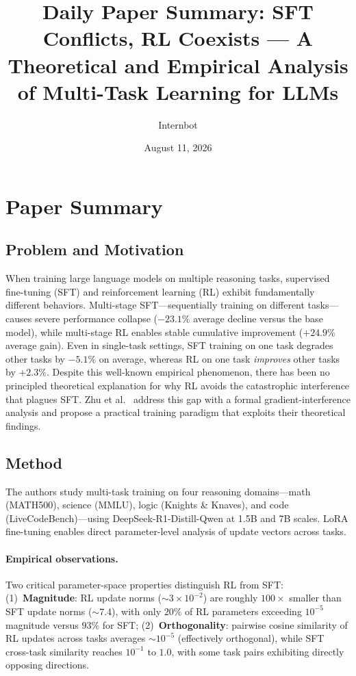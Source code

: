 \documentclass[11pt,a4paper]{article}
\title{Daily Paper Summary: SFT Conflicts, RL Coexists --- A Theoretical and Empirical Analysis of Multi-Task Learning for LLMs}
\author{Internbot}
\date{August 11, 2026}
\begin{document}
\maketitle

\section{Paper Summary}

\subsection{Problem and Motivation}

When training large language models on multiple reasoning tasks, supervised fine-tuning (SFT) and reinforcement learning (RL) exhibit fundamentally different behaviors. Multi-stage SFT---sequentially training on different tasks---causes severe performance collapse ($-23.1\%$ average decline versus the base model), while multi-stage RL enables stable cumulative improvement ($+24.9\%$ average gain). Even in single-task settings, SFT training on one task degrades other tasks by $-5.1\%$ on average, whereas RL on one task \emph{improves} other tasks by $+2.3\%$. Despite this well-known empirical phenomenon, there has been no principled theoretical explanation for why RL avoids the catastrophic interference that plagues SFT. Zhu et al.~\cite{zhu2026sft} address this gap with a formal gradient-interference analysis and propose a practical training paradigm that exploits their theoretical findings.

\subsection{Method}

The authors study multi-task training on four reasoning domains---math (MATH500), science (MMLU), logic (Knights \& Knaves), and code (LiveCodeBench)---using DeepSeek-R1-Distill-Qwen at 1.5B and 7B scales. LoRA fine-tuning enables direct parameter-level analysis of update vectors across tasks.

\paragraph{Empirical observations.} Two critical parameter-space properties distinguish RL from SFT: (1)~\textbf{Magnitude}: RL update norms ($\sim\!3 \times 10^{-2}$) are roughly $100\times$ smaller than SFT update norms ($\sim\!7.4$), with only $20\%$ of RL parameters exceeding $10^{-5}$ magnitude versus $93\%$ for SFT; (2)~\textbf{Orthogonality}: pairwise cosine similarity of RL updates across tasks averages $\sim\!10^{-5}$ (effectively orthogonal), while SFT cross-task similarity reaches $10^{-1}$ to $1.0$, with some task pairs exhibiting directly opposing directions.
\end{document}
